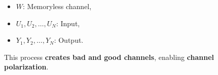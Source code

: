\documentclass[11pt]{article}
\makeatletter
\providecommand{\tightlist}{%
      \setlength{\itemsep}{0pt}\setlength{\parskip}{0pt}}
\newcommand{\boxspacing}{\kern\kvtcb@left@rule\kern\kvtcb@boxsep}
\newcommand{\prompt}[4]{
        {\ttfamily\llap{{\color{#2}[#3]:\hspace{3pt}#4}}\vspace{-\baselineskip}}
    }
\makeatother
\begin{document}
\begin{itemize}
\tightlist
\item
  \(W\): Memoryless channel,
\item
  \(U_1, U_2, \dots, U_N\): Input,
\item
  \(Y_1, Y_2, \dots, Y_N\): Output.
\end{itemize}

This process \textbf{creates bad and good channels}, enabling
\textbf{channel polarization}.

    \begin{tcolorbox}[breakable, size=fbox, boxrule=1pt, pad at break*=1mm,colback=cellbackground, colframe=cellborder]
\prompt{In}{incolor}{ }{\boxspacing}
\begin{Verbatim}[commandchars=\\\{\}]

\end{Verbatim}
\end{tcolorbox}


    
    
    
\end{document}

